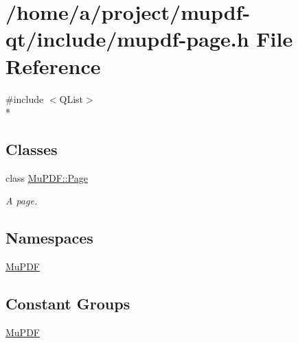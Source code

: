 \hypertarget{mupdf-page_8h}{\section{/home/a/project/mupdf-\/qt/include/mupdf-\/page.h File Reference}
\label{mupdf-page_8h}
}
{\ttfamily \#include $<$Q\-List$>$}\\*
\subsection*{Classes}
\begin{DoxyCompactItemize}
\item 
class \hyperlink{class_mu_p_d_f_1_1_page}{Mu\-P\-D\-F\-::\-Page}
\begin{DoxyCompactList}\small\item\em A page. \end{DoxyCompactList}\end{DoxyCompactItemize}
\subsection*{Namespaces}
\begin{DoxyCompactItemize}
\item 
\hyperlink{namespace_mu_p_d_f}{Mu\-P\-D\-F}
\end{DoxyCompactItemize}
\subsection*{Constant Groups}
\begin{DoxyCompactItemize}
\item 
\hyperlink{namespace_mu_p_d_f}{Mu\-P\-D\-F}
\end{DoxyCompactItemize}
